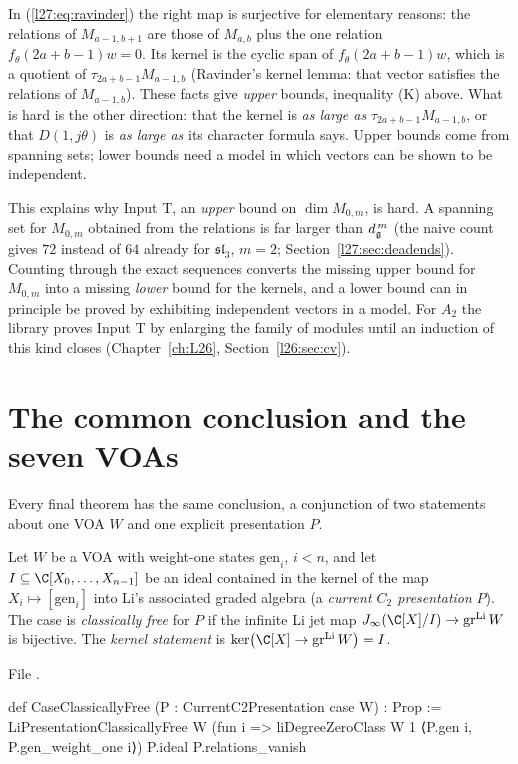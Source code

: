 \begin{warning}[title={The surjection half is free; the injection half is not}]
In (\ref{l27:eq:ravinder}) the right map is surjective for elementary reasons: the relations of $M_{a-1,b+1}$ are those of
$M_{a,b}$ plus the one relation $f_\theta(2a+b-1)w=0$. Its kernel is the cyclic span of $f_\theta(2a+b-1)w$, which is a quotient of
$\tau_{2a+b-1}M_{a-1,b}$ (Ravinder's kernel lemma: that vector satisfies the relations of $M_{a-1,b}$). These facts give
\emph{upper} bounds, inequality (K) above. What is hard is the other direction: that the kernel is \emph{as large as}
$\tau_{2a+b-1}M_{a-1,b}$, or that $D(1,j\theta)$ is \emph{as large as} its character formula says. Upper bounds come from spanning
sets; lower bounds need a model in which vectors can be shown to be independent.

This explains why Input T, an \emph{upper} bound on $\dim M_{0,m}$, is hard. A spanning set for $M_{0,m}$ obtained from the
relations is far larger than $d_{\mathfrak g}^{\,m}$ (the naive count gives $72$ instead of $64$ already for
$\mathfrak{sl}_3$, $m=2$; Section~\ref{l27:sec:deadends}). Counting through the exact sequences converts the missing upper bound
for $M_{0,m}$ into a missing \emph{lower} bound for the kernels, and a lower bound can in principle be proved by exhibiting
independent vectors in a model. For $A_2$ the library proves Input T by enlarging the family of modules until an induction
of this kind closes (Chapter~\ref{ch:L26}, Section~\ref{l26:sec:cv}).
\end{warning}

\section{The common conclusion and the seven VOAs}\label{l27:sec:conclusion}

Every final theorem has the same conclusion, a conjunction of two statements about one VOA $W$ and one explicit
presentation $P$.

\begin{definition}\label{l27:def:conclusion}
Let $W$ be a VOA with weight-one states $\mathrm{gen}_i$, $i<n$, and let $I\subseteq\C[X_0,\dots,X_{n-1}]$ be an ideal
contained in the kernel of the map $X_i\mapsto[\mathrm{gen}_i]$ into Li's associated graded algebra (a \emph{current
$C_2$ presentation} $P$). The case is \emph{classically free} for $P$ if the infinite Li jet map
$\ltwentysevenJ(\C[X]/I)\to\ltwentysevengr^{\mathrm{Li}}W$ is bijective. The \emph{kernel statement} is
$\ker\bigl(\C[X]\to\ltwentysevengr^{\mathrm{Li}}W\bigr)=I$.
\end{definition}
\noindent File .
\begin{leancode}
def CaseClassicallyFree (P : CurrentC2Presentation case W) : Prop :=
  LiPresentationClassicallyFree W
    (fun i => liDegreeZeroClass W 1 ⟨P.gen i, P.gen_weight_one i⟩)
    P.ideal P.relations_vanish
\end{leancode}


